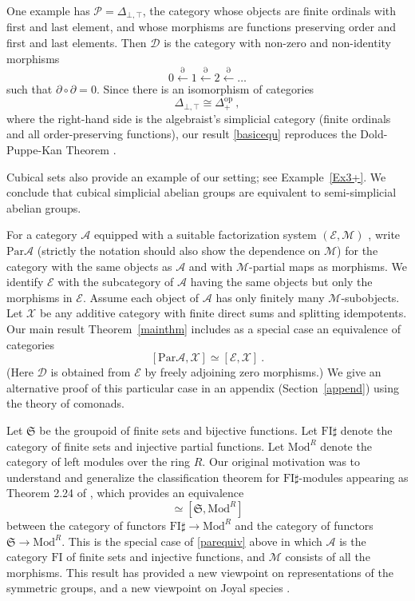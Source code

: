\documentclass[a4paper,12pt,reqno]{amsart}
\theoremstyle{definition}
\theoremstyle{fact}
\theoremstyle{genquest}
\theoremstyle{step}
\newcommand{\lla}{\longleftarrow}
\newcommand{\ra}{\rightarrow}
\def\CA{{\mathscr A}}
\def\CD{{\mathscr D}}
\def\CE{{\mathscr E}}
\def\CM{{\mathscr M}}
\def\CP{{\mathscr P}}
\def\CX{{\mathscr X}}
\begin{document}
One example has $\CP = \Delta_{\bot,\top}$, the category whose objects are 
finite ordinals with first and last element, and whose morphisms are functions
preserving order and first and last elements. Then $\CD$ is the category with
non-zero and non-identity morphisms
\begin{equation*}
0\stackrel{\partial}\lla 1 \stackrel{\partial}\lla 2\stackrel{\partial}\lla \dots 
\end{equation*}
such that $\partial \circ \partial = 0$.
Since there is an isomorphism of categories 
\begin{equation}\label{interval}
\Delta_{\bot,\top} \cong \Delta_+^{\mathrm{op}} \ ,
\end{equation} 
where the right-hand side is the algebraist's simplicial category (finite ordinals
and all order-preserving functions),
our result \eqref{basicequ} reproduces the Dold-Puppe-Kan Theorem
\cite{Dold, DoldPuppe, Kan}.  

Cubical sets also provide an example of our setting; see Example~\ref{Ex3+}.
We conclude that cubical simplicial abelian groups are equivalent to semi-simplicial
abelian groups. 

For a category $\CA$ equipped with a suitable factorization system 
$(\CE,\CM)$ \cite{FreydKelly},
write $\mathrm{Par}\CA$ (strictly the notation should also show the dependence 
on $\CM$) for the category with the same objects as $\CA$ and
with $\CM$-partial maps as morphisms. We identify $\CE$ with the subcategory of
$\CA$ having the same objects but only the morphisms in $\CE$.
Assume each object of $\CA$ has only finitely many $\CM$-subobjects.
Let $\CX$ be any additive category with finite direct sums and splitting idempotents.
Our main result Theorem~\ref{mainthm} includes as a special case an equivalence of categories
\begin{equation}\label{parequiv}
[\mathrm{Par}\CA,\CX] \simeq [\CE,\CX] \ .
\end{equation}
(Here $\CD$ is obtained from $\CE$ by freely adjoining zero morphisms.)
We give an alternative proof of this particular case in an appendix (Section~\ref{append}) using the theory of comonads.

Let $\mathfrak{S}$ be the groupoid of finite sets and bijective functions.
Let $\mathrm{FI}\sharp$ denote the category of finite sets and injective partial functions.
Let $\mathrm{Mod}^R$ denote the category of left modules over the ring $R$.
Our original motivation was to understand and generalize the classification theorem for 
$\mathrm{FI}\sharp$-modules appearing as Theorem 2.24 of \cite{CEF2012},
which provides an equivalence 
\begin{equation*}
[\mathrm{FI}\sharp, \mathrm{Mod}^R] \simeq [\mathfrak{S}, \mathrm{Mod}^R]
\end{equation*}
between the category of functors $\mathrm{FI}\sharp \ra \mathrm{Mod}^R$
and the category of functors $\mathfrak{S} \ra \mathrm{Mod}^R$. 
This is the special case of \eqref{parequiv} above in which $\CA$ is
the category $\mathrm{FI}$ of finite sets and injective functions, 
and $\CM$ consists of all the morphisms. 
This result has provided a new viewpoint on representations of the 
symmetric groups, and a new viewpoint on Joyal species \cite{Species, AnalFunct}.
\end{document}
